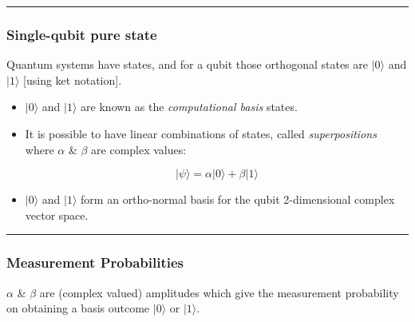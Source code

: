 \begin{center}\rule{0.5\linewidth}{0.5pt}\end{center}

\hypertarget{single-qubit-pure-state}{%
\subsubsection*{Single-qubit pure state}\label{single-qubit-pure-state}}

Quantum systems have states, and for a qubit those orthogonal states are
\( \lvert0\rangle\) and \(\lvert1\rangle \) {[}using ket notation{]}.

\begin{itemize}
\item
  \(\lvert0\rangle\) and \(\lvert1\rangle\) are known as the
  \emph{computational basis} states.
\item
  It is possible to have linear combinations of states, called
  \emph{superpositions} where \(\alpha\) \& \(\beta\) are complex
  values:

  \[|\psi\rangle = \alpha \lvert0\rangle + \beta \lvert1\rangle\]
\item
  \(\lvert0\rangle\) and \(\lvert1\rangle\) form an ortho-normal basis
  for the qubit 2-dimensional complex vector space.
\end{itemize}

\begin{center}\rule{0.5\linewidth}{0.5pt}\end{center}

\hypertarget{measurement-probabilities}{%
\subsubsection*{Measurement
Probabilities}\label{measurement-probabilities}}

\(\alpha\) \& \(\beta\) are (complex valued) amplitudes which give the
measurement probability on obtaining a basis outcome \(\lvert0\rangle\)
or \(\lvert1\rangle\).

